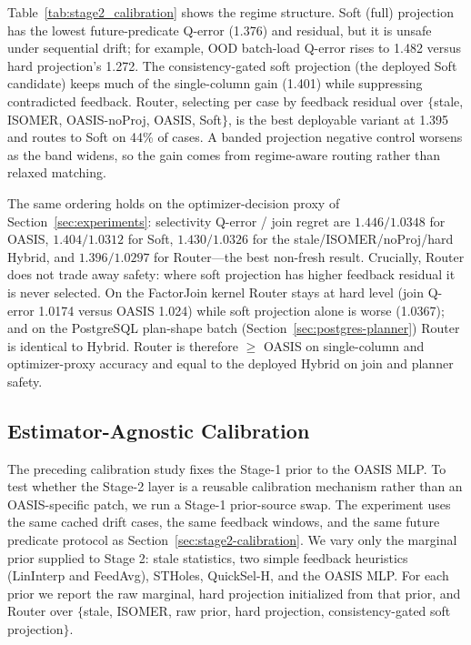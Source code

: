 \documentclass[preprint,12pt]{elsarticle}
\begin{document}
Table~\ref{tab:stage2_calibration} shows the regime structure. Soft (full)
projection has the lowest future-predicate Q-error (1.376) and residual, but it
is unsafe under sequential drift; for example, OOD batch-load Q-error rises to
1.482 versus hard projection's 1.272. The consistency-gated soft projection (the
deployed Soft candidate) keeps much of the single-column gain (1.401) while
suppressing contradicted feedback. Router,
selecting per case by feedback residual over
$\{$stale, ISOMER, OASIS-noProj, OASIS, Soft$\}$, is the best
deployable variant at 1.395 and routes to Soft on 44\% of cases. A banded
projection negative control worsens as the band widens, so the gain comes from
regime-aware routing rather than relaxed matching.

The same ordering holds on the optimizer-decision proxy of
Section~\ref{sec:experiments}: selectivity Q-error / join regret are
$1.446/1.0348$ for OASIS, $1.404/1.0312$ for Soft,
$1.430/1.0326$ for the stale/ISOMER/noProj/hard Hybrid, and $1.396/1.0297$ for
Router---the best non-fresh result. Crucially, Router does not
trade away safety: where soft projection has higher feedback residual it is never
selected. On the FactorJoin kernel Router stays at hard level
(join Q-error 1.0174 versus OASIS 1.024) while soft projection alone is worse
(1.0367); and on the PostgreSQL plan-shape batch
(Section~\ref{sec:postgres-planner}) Router is identical to Hybrid. Router is
therefore $\ge$ OASIS on single-column and
optimizer-proxy accuracy and equal to the deployed Hybrid on join and planner
safety.

\subsection{Estimator-Agnostic Calibration}
\label{sec:stage1-swap}

The preceding calibration study fixes the Stage-1 prior to the OASIS MLP. To
test whether the Stage-2 layer is a reusable calibration mechanism rather than
an OASIS-specific patch, we run a Stage-1 prior-source swap. The experiment uses
the same cached drift cases, the same feedback windows, and the same future
predicate protocol as Section~\ref{sec:stage2-calibration}. We vary only the
marginal prior supplied to Stage 2: stale statistics, two simple feedback
heuristics (LinInterp and FeedAvg), STHoles, QuickSel-H, and the OASIS MLP. For
each prior we report the raw marginal, hard projection initialized from that
prior, and Router over
$\{$stale, ISOMER, raw prior, hard projection, consistency-gated soft projection$\}$.
\end{document}
